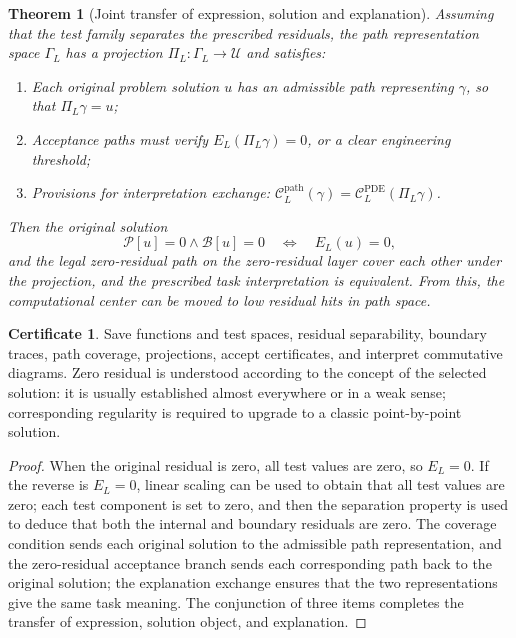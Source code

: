 \documentclass[11pt,a4paper]{article}
\theoremstyle{plain}
\newtheorem{theorem}{Theorem}[section]
\theoremstyle{definition}
\newtheorem*{certificate}{Certificate}
\theoremstyle{remark}
\begin{document}
\begin{CJK*}
\begin{theorem}
[Joint transfer of expression, solution and explanation]\label{ss:pde-equivalence}
Assuming that the test family separates the prescribed residuals, the path representation space $\Gamma_L$ has a projection $\Pi_L:\Gamma_L\to\mathcal U$ and satisfies:\begin{enumerate}
\item
Each original problem solution $u$ has an admissible path representing $\gamma$, so that $\Pi_L\gamma=u$;\item
Acceptance paths must verify $E_L(\Pi_L\gamma)=0$, or a clear engineering threshold;\item
Provisions for interpretation exchange: $\mathcal C_L^{\mathrm{path}}(\gamma)=\mathcal C_L^{\mathrm{PDE}}(\Pi_L\gamma)$.\end{enumerate}
Then the original solution \[
 \mathcal P[u]=0\wedge\mathcal B[u]=0
 \quad\Longleftrightarrow\quad E_L(u)=0,
\] and the legal zero-residual path on the zero-residual layer cover each other under the projection, and the prescribed task interpretation is equivalent. From this, the computational center can be moved to low residual hits in path space.\end{theorem}
\begin{certificate}
Save functions and test spaces, residual separability, boundary traces, path coverage, projections, accept certificates, and interpret commutative diagrams. Zero residual is understood according to the concept of the selected solution: it is usually established almost everywhere or in a weak sense; corresponding regularity is required to upgrade to a classic point-by-point solution.\end{certificate}
\begin{proof}
When the original residual is zero, all test values are zero, so $E_L=0$. If the reverse is $E_L=0$, linear scaling can be used to obtain that all test values are zero; each test component is set to zero, and then the separation property is used to deduce that both the internal and boundary residuals are zero. The coverage condition sends each original solution to the admissible path representation, and the zero-residual acceptance branch sends each corresponding path back to the original solution; the explanation exchange ensures that the two representations give the same task meaning. The conjunction of three items completes the transfer of expression, solution object, and explanation.\end{proof}



\end{CJK*}
\end{document}
